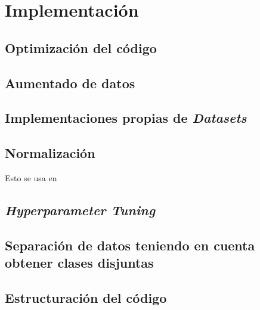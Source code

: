 \chapter{Implementación} \label{ich:implementacion}

\section{Optimización del código} \label{isec:optimizacion_codigo}

\section{Aumentado de datos} \label{isec:aumentado_datos}

\section{Implementaciones propias de \textit{Datasets}} \label{isec:datasets_customs}

\section{Normalización}

Esto se usa en \cite{informatica:facenet}

\section{\textit{Hyperparameter Tuning}}

\section{Separación de datos teniendo en cuenta obtener clases disjuntas}

\section{Estructuración del código}


